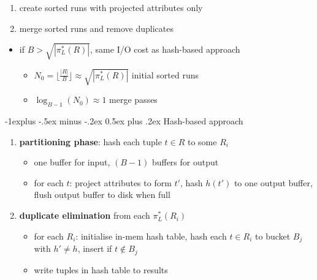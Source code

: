 \documentclass[10pt, landscape]{article}
\makeatletter
\renewcommand{\subsection}{\@startsection{subsection}{2}{0mm}%
  {-1explus -.5ex minus -.2ex}%
  {0.5ex plus .2ex}%
{\normalfont\normalsize\bfseries}}
\makeatother
\begin{document}
\begin{multicols*}{4}
  \begin{enumerate}
    \item create sorted runs with projected attributes only
    \item merge sorted runs and remove duplicates
  \end{enumerate}
  \begin{itemize}
    \item if $B>\sqrt{|\pi^*_L(R)|}$, same I/O cost as hash-based approach
      \begin{itemize}
        \item $N_0 = \lfloor \frac{|R|}{B} \rfloor \approx \sqrt{|\pi^*_L(R)|}$ initial sorted runs 
        \item $\log_{B-1}(N_0) \approx 1$ merge passes
      \end{itemize}
  \end{itemize}

  \subsection{Hash-based approach}

  \begin{enumerate}
    \item \textbf{partitioning phase}: hash each tuple $t \in R$ to some $R_i$
      \begin{itemize}
        \item one buffer for input, $(B-1)$ buffers for output
        \item for each $t$: project attributes to form $t'$, hash $h(t')$ to one output buffer, flush output buffer to disk when full
      \end{itemize}
    \item \textbf{duplicate elimination} from each $\pi^*_L(R_i)$
      \begin{itemize}
        \item for each $R_i$: initialise in-mem hash table, hash each $t \in R_i$ to bucket $B_j$ with $h' \neq h$, insert if $t \not\in B_j$
        \item write tuples in hash table to results
      \end{itemize}
  \end{enumerate}


\end{multicols*}
\end{document}
